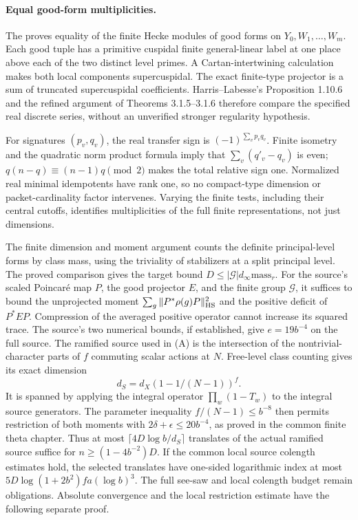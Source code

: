 \paragraph{Equal good-form multiplicities.}
The  proves equality of the finite Hecke modules of good forms
on \(Y_0,W_1,\ldots,W_m\). Each good tuple has a primitive
cuspidal finite general-linear label at one place above each of the
two distinct level primes. A Cartan-intertwining calculation makes
both local components supercuspidal. The exact finite-type projector
is a sum of truncated supercuspidal coefficients. Harris--Labesse's
Proposition 1.10.6 and the refined argument of Theorems 3.1.5--3.1.6
therefore compare the specified real discrete series, without an
unverified stronger regularity hypothesis.

For signatures \((p_v,q_v)\), the real transfer sign is
\((-1)^{\sum_vp_vq_v}\). Finite isometry and the quadratic norm
product formula imply that \(\sum_v(q'_v-q_v)\) is even;
\(q(n-q)\equiv(n-1)q\pmod2\) makes the total relative sign one.
Normalized real minimal idempotents have rank one, so no compact-type
dimension or packet-cardinality factor intervenes. Varying the finite
tests, including their central cutoffs, identifies multiplicities of
the full finite representations, not just dimensions.

The 
{finite dimension and moment argument} counts the definite
principal-level forms by class mass, using the triviality of
stabilizers at a split principal level. The proved comparison gives
the target bound \(D\le|\mathcal G|d_\infty\mathrm{mass}_r\).
For the source's scaled Poincar\'e map \(P\), the good
projector \(E\), and the finite group \(\mathcal G\), it
suffices to bound the unprojected moment
\(\sum_g\|P^*\rho(g)P\|_{\rm HS}^2\) and the positive
deficit of \(P^*EP\). Compression of the averaged positive
operator cannot increase its squared trace. The source's two numerical bounds, if established, give
\(e=19b^{-4}\) on the full source. The ramified source used
in (A) is the intersection of the nontrivial-character
parts of \(f\) commuting scalar actions at \(N\).
Free-level class counting gives its exact dimension
\[
 d_S=d_X(1-1/(N-1))^f.
\]
It is spanned by applying the integral operator
\(\prod_w(1-T_w)\) to the integral source generators.
The parameter inequality \(f/(N-1)\le b^{-8}\)
then permits restriction of both moments with
\(2\delta+\epsilon\le20b^{-4}\), as proved in the
common finite theta chapter. Thus at most
\(\lceil4D\log b/d_S\rceil\) translates of the actual
ramified source suffice for \(n\ge(1-4b^{-2})D\).
If the common local source colength estimates hold,
the selected translates have one-sided logarithmic
index at most \(5D\log(1+2b^2)fa(\log b)^3\).
The full see-saw and local colength budget remain obligations.
Absolute convergence and the local restriction estimate have the
following separate proof.

